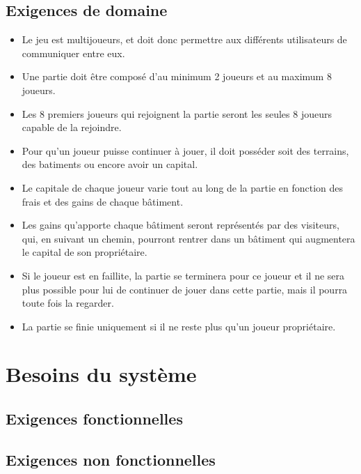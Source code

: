 \documentclass[a4paper,11pt]{report}
\begin{document}
\section{Exigences de domaine}
\begin{itemize}
 \item Le jeu est multijoueurs, et doit donc permettre aux différents utilisateurs de communiquer entre eux.
 \item Une partie doit être composé d'au minimum 2 joueurs et au maximum 8 joueurs.
 \item Les 8 premiers joueurs qui rejoignent la partie seront les seules 8 joueurs capable de la rejoindre.
 \item Pour qu'un joueur puisse continuer à jouer, il doit posséder soit des terrains, des batiments ou encore avoir
 un capital. 
 \item Le capitale de chaque joueur varie tout au long de la partie en fonction des frais et des gains de chaque bâtiment.
 \item Les gains qu'apporte chaque bâtiment seront représentés par des visiteurs, qui, en suivant un chemin, pourront 
 rentrer dans un bâtiment qui augmentera le capital de son propriétaire.
 \item Si le joueur est en faillite, la partie se terminera pour ce joueur et il ne sera plus possible pour lui de
 continuer de jouer dans cette partie, mais il pourra toute fois la regarder.
 \item La partie se finie uniquement si il ne reste plus qu'un joueur propriétaire.

 \end{itemize}

\newpage
\chapter{Besoins du système}
\section{Exigences fonctionnelles}
\section{Exigences non fonctionnelles}
\end{document}
